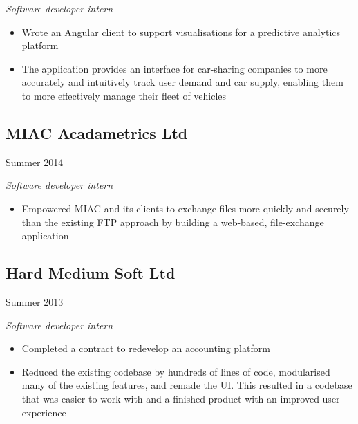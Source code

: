 \emph{Software developer intern}

\begin{itemize}
\item Wrote an Angular client to support visualisations for a predictive
  analytics platform
\item The application provides an interface for car-sharing companies to more
  accurately and intuitively track user demand and car supply, enabling them to
  more effectively manage their fleet of vehicles
\end{itemize}

\noindent\begin{minipage}[t]{0.5\textwidth}
  \subsection*{MIAC Acadametrics Ltd}
\end{minipage}
\noindent\begin{minipage}[t]{0.5\textwidth}
  \flushright
  Summer 2014
\end{minipage}

\emph{Software developer intern}

\begin{itemize}
\item Empowered MIAC and its clients to exchange files more quickly and securely
  than the existing FTP approach by building a web-based, file-exchange
  application
\end{itemize}

\noindent\begin{minipage}[t]{0.5\textwidth}
  \subsection*{Hard Medium Soft Ltd}
\end{minipage}
\noindent\begin{minipage}[t]{0.5\textwidth}
  \flushright
  Summer 2013
\end{minipage}

\emph{Software developer intern}

\begin{itemize}
\item Completed a contract to redevelop an accounting platform
\item Reduced the existing codebase by hundreds of lines of code, modularised
  many of the existing features, and remade the UI. This resulted in a codebase
  that was easier to work with and a finished product with an improved user
  experience
\end{itemize}


